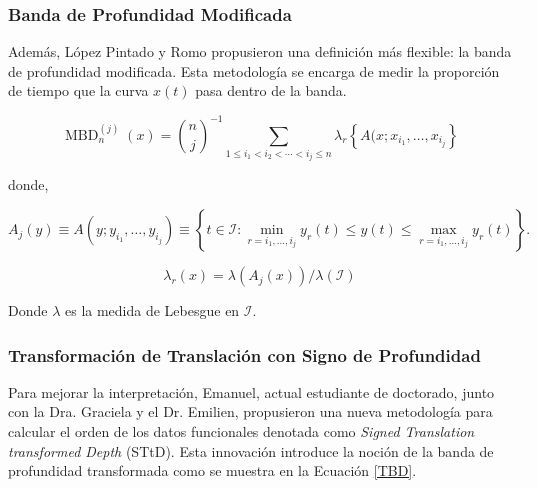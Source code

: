 \subsubsection{Banda de Profundidad Modificada}

Además, López Pintado y Romo propusieron una definición más flexible: la banda de profundidad modificada. Esta metodología se encarga de medir la proporción de tiempo que la curva $x(t)$ pasa dentro de la banda. \cite{boxplotFun}

\begin{equation}
    \operatorname{MBD}_n^{(j)}(x) = \binom{n}{j}^{-1} \sum_{1 \leq i_1<i_2<\cdots<i_j \leq n} \lambda_r \left\{ A(x ; x_{i_{1}}, \dots, x_{i_{j}}\right\}
\end{equation}

donde, 

\begin{equation}
    A_j(y) \equiv A\left(y ; y_{i_1}, \ldots, y_{i_j}\right) \equiv \left\{t \in \mathcal{I}: \min _{r=i_1, \ldots, i_j} y_r(t) \leq y(t) \leq \max _{r=i_1, \ldots, i_j} y_r(t) \right\}.
\end{equation}

\begin{equation}
    \lambda_r(x) = \lambda(A_j(x))/\lambda(\mathcal{I})
\end{equation}

Donde $\lambda$ es la medida de Lebesgue en $\mathcal{I}$.
\subsubsection{Transformación de Translación con Signo de Profundidad}

    Para mejorar la interpretación, Emanuel, actual estudiante de doctorado, junto con la Dra. Graciela y el Dr. Emilien, propusieron una nueva metodología para calcular el orden de los datos funcionales denotada como \textit{Signed Translation transformed Depth} (STtD). Esta innovación introduce la noción de la banda de profundidad transformada como se muestra en la Ecuación \eqref{TBD}. \cite{BandaEmanuel} 
    
